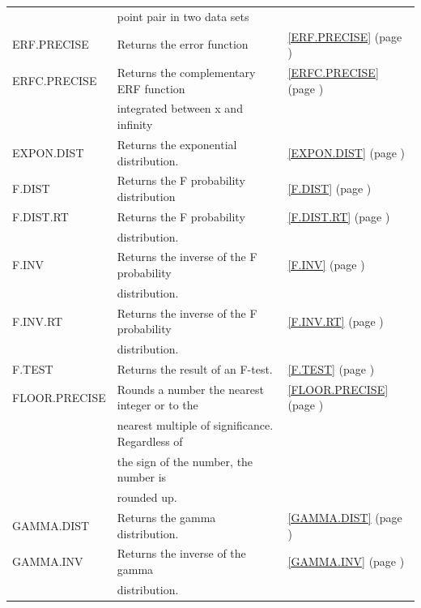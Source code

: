 \begin{center}
\begin{longtable}{l l l }
		& point pair in two data sets &   \\
		ERF.PRECISE & Returns the error function &  \ref{ERF.PRECISE} (page \pageref{ERF.PRECISE}) \index{Spreadsheet Functions!ERF.PRECISE} \\
		ERFC.PRECISE & Returns the complementary ERF function &  \ref{ERFC.PRECISE} (page \pageref{ERFC.PRECISE}) \index{Spreadsheet Functions!ERFC.PRECISE} \\
		& integrated between x and infinity &   \\
		EXPON.DIST & Returns the exponential distribution. &  \ref{EXPON.DIST} (page \pageref{EXPON.DIST}) \index{Spreadsheet Functions!EXPON.DIST} \\
		F.DIST & Returns the F probability distribution &  \ref{F.DIST} (page \pageref{F.DIST}) \index{Spreadsheet Functions!F.DIST} \\
		F.DIST.RT & Returns the F probability  &  \ref{F.DIST.RT} (page \pageref{F.DIST.RT}) \index{Spreadsheet Functions!F.DIST.RT} \\
		& distribution. &   \\
		F.INV & Returns the inverse of the F probability &  \ref{F.INV} (page \pageref{F.INV}) \index{Spreadsheet Functions!F.INV} \\
		& distribution. &   \\
		F.INV.RT & Returns the inverse of the F probability &  \ref{F.INV.RT} (page \pageref{F.INV.RT}) \index{Spreadsheet Functions!F.INV.RT} \\
		& distribution. &   \\
		F.TEST & Returns the result of an F-test. &  \ref{F.TEST} (page \pageref{F.TEST}) \index{Spreadsheet Functions!F.TEST} \\
		FLOOR.PRECISE & Rounds a number the nearest integer or to the &  \ref{FLOOR.PRECISE} (page \pageref{FLOOR.PRECISE}) \index{Spreadsheet Functions!FLOOR.PRECISE} \\
		& nearest multiple of significance. Regardless of &   \\
		& the sign of the number, the number is  &   \\
		& rounded up. &   \\
		GAMMA.DIST & Returns the gamma distribution. &  \ref{GAMMA.DIST} (page \pageref{GAMMA.DIST}) \index{Spreadsheet Functions!GAMMA.DIST} \\
		GAMMA.INV & Returns the inverse of the gamma  &  \ref{GAMMA.INV} (page \pageref{GAMMA.INV}) \index{Spreadsheet Functions!GAMMA.INV} \\
		& distribution. &   \\

\end{longtable}
\end{center}
